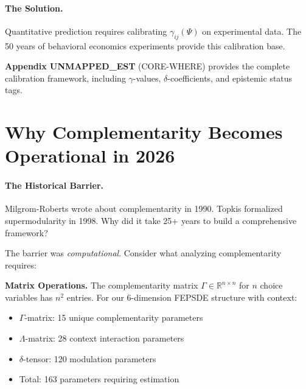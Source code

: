 \paragraph{The Solution.}
Quantitative prediction requires calibrating $\gamma_{ij}(\Psi)$ on experimental data.
The 50 years of behavioral economics experiments provide this calibration base.

\begin{cross-reference}
\textbf{Appendix UNMAPPED_EST} (CORE-WHERE) provides the complete calibration framework,
including $\gamma$-values, $\delta$-coefficients, and epistemic status tags.
\end{cross-reference}



\section{Why Complementarity Becomes Operational in 2026}
\label{sec:comp-computational}


\paragraph{The Historical Barrier.}
Milgrom-Roberts wrote about complementarity in 1990.
Topkis formalized supermodularity in 1998.
Why did it take 25+ years to build a comprehensive framework?

The barrier was \emph{computational}. Consider what analyzing complementarity requires:

\textbf{Matrix Operations.}
The complementarity matrix $\Gamma \in \mathbb{R}^{n \times n}$ for $n$ choice variables
has $n^2$ entries. For our 6-dimension FEPSDE structure with context:
\begin{itemize}[nosep]
  \item $\Gamma$-matrix: 15 unique complementarity parameters
  \item $\Lambda$-matrix: 28 context interaction parameters
  \item $\delta$-tensor: 120 modulation parameters
  \item Total: 163 parameters requiring estimation
\end{itemize}

